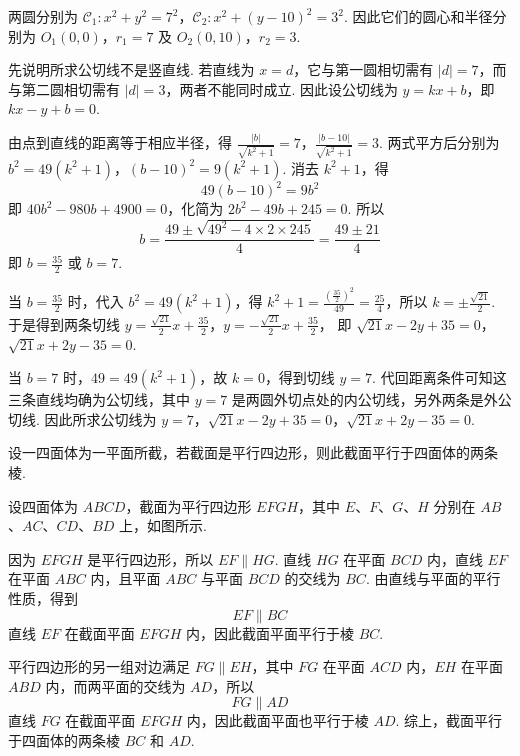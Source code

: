 \begin{solution}
两圆分别为
\(\mathcal C_{1}:x^{2}+y^{2}=7^{2}\)，\(\mathcal C_{2}:x^{2}+(y-10)^{2}=3^{2}\).
因此它们的圆心和半径分别为 \(O_{1}(0,0)\)，\(r_{1}=7\) 及 \(O_{2}(0,10)\)，\(r_{2}=3\).

先说明所求公切线不是竖直线. 若直线为 \(x=d\)，它与第一圆相切需有 \(|d|=7\)，而与第二圆相切需有 \(|d|=3\)，两者不能同时成立. 因此设公切线为 \(y=kx+b\)，即
\(kx-y+b=0\).

由点到直线的距离等于相应半径，得
\(\frac{|b|}{\sqrt{k^{2}+1}}=7\)，\(\frac{|b-10|}{\sqrt{k^{2}+1}}=3\).
两式平方后分别为
\(b^{2}=49(k^{2}+1)\)，\((b-10)^{2}=9(k^{2}+1)\).
消去 \(k^{2}+1\)，得
\[
49(b-10)^{2}=9b^{2}
\]
即
\(40b^{2}-980b+4900=0\)，化简为 \(2b^{2}-49b+245=0\).
所以
\[
b=\frac{49\pm\sqrt{49^{2}-4\times2\times245}}{4}=\frac{49\pm21}{4}
\]
即 \(b=\frac{35}{2}\) 或 \(b=7\).

当 \(b=\frac{35}{2}\) 时，代入 \(b^{2}=49(k^{2}+1)\)，得
\(k^{2}+1=\frac{(\frac{35}{2})^{2}}{49}=\frac{25}{4}\)，所以 \(k=\pm\frac{\sqrt{21}}{2}\).
于是得到两条切线
\(y=\frac{\sqrt{21}}{2}x+\frac{35}{2}\)，\(y=-\frac{\sqrt{21}}{2}x+\frac{35}{2}\)，
即
\(\sqrt{21}x-2y+35=0\)，\(\sqrt{21}x+2y-35=0\).

当 \(b=7\) 时，\(49=49(k^{2}+1)\)，故 \(k=0\)，得到切线 \(y=7\). 代回距离条件可知这三条直线均确为公切线，其中 \(y=7\) 是两圆外切点处的内公切线，另外两条是外公切线. 因此所求公切线为
\(y=7\)，\(\sqrt{21}x-2y+35=0\)，\(\sqrt{21}x+2y-35=0\).
\end{solution}

\begin{problem}
设一四面体为一平面所截，若截面是平行四边形，则此截面平行于四面体的两条棱.
\end{problem}

\begin{solution}
设四面体为 \(ABCD\)，截面为平行四边形 \(EFGH\)，其中 \(E\)、\(F\)、\(G\)、\(H\) 分别在 \(AB\)、\(AC\)、\(CD\)、\(BD\) 上，如图所示.

因为 \(EFGH\) 是平行四边形，所以 \(EF\parallel HG\). 直线 \(HG\) 在平面 \(BCD\) 内，直线 \(EF\) 在平面 \(ABC\) 内，且平面 \(ABC\) 与平面 \(BCD\) 的交线为 \(BC\). 由直线与平面的平行性质，得到
\[
EF\parallel BC
\]
直线 \(EF\) 在截面平面 \(EFGH\) 内，因此截面平面平行于棱 \(BC\).

平行四边形的另一组对边满足 \(FG\parallel EH\)，其中 \(FG\) 在平面 \(ACD\) 内，\(EH\) 在平面 \(ABD\) 内，而两平面的交线为 \(AD\)，所以
\[
FG\parallel AD
\]
直线 \(FG\) 在截面平面 \(EFGH\) 内，因此截面平面也平行于棱 \(AD\). 综上，截面平行于四面体的两条棱 \(BC\) 和 \(AD\).
\end{solution}

